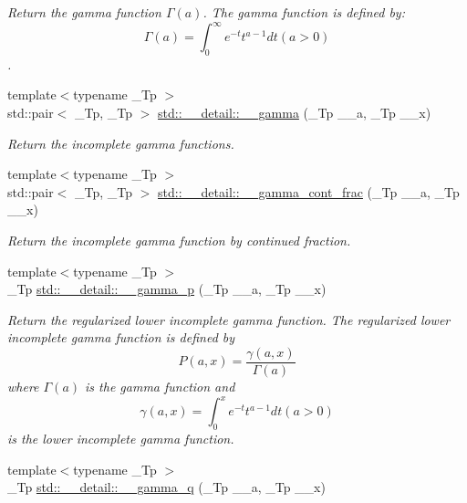 \begin{DoxyCompactItemize}
\begin{DoxyCompactList}\small\item\em Return the gamma function $ \Gamma(a) $. The gamma function is defined by\+: \[ \Gamma(a) = \int_0^\infty e^{-t}t^{a-1}dt (a > 0) \]. \end{DoxyCompactList}\item 
{\footnotesize template$<$typename \+\_\+\+Tp $>$ }\\std\+::pair$<$ \+\_\+\+Tp, \+\_\+\+Tp $>$ \hyperlink{namespacestd_1_1____detail_a00ade496acee116fb7990d20ff4be762}{std\+::\+\_\+\+\_\+detail\+::\+\_\+\+\_\+gamma} (\+\_\+\+Tp \+\_\+\+\_\+a, \+\_\+\+Tp \+\_\+\+\_\+x)
\begin{DoxyCompactList}\small\item\em Return the incomplete gamma functions. \end{DoxyCompactList}\item 
{\footnotesize template$<$typename \+\_\+\+Tp $>$ }\\std\+::pair$<$ \+\_\+\+Tp, \+\_\+\+Tp $>$ \hyperlink{namespacestd_1_1____detail_afd6319747af991947a02388acee40c26}{std\+::\+\_\+\+\_\+detail\+::\+\_\+\+\_\+gamma\+\_\+cont\+\_\+frac} (\+\_\+\+Tp \+\_\+\+\_\+a, \+\_\+\+Tp \+\_\+\+\_\+x)
\begin{DoxyCompactList}\small\item\em Return the incomplete gamma function by continued fraction. \end{DoxyCompactList}\item 
{\footnotesize template$<$typename \+\_\+\+Tp $>$ }\\\+\_\+\+Tp \hyperlink{namespacestd_1_1____detail_a4583981bd73c3d3bba970c2f91dc4ba5}{std\+::\+\_\+\+\_\+detail\+::\+\_\+\+\_\+gamma\+\_\+p} (\+\_\+\+Tp \+\_\+\+\_\+a, \+\_\+\+Tp \+\_\+\+\_\+x)
\begin{DoxyCompactList}\small\item\em Return the regularized lower incomplete gamma function. The regularized lower incomplete gamma function is defined by \[ P(a,x) = \frac{\gamma(a,x)}{\Gamma(a)} \] where $ \Gamma(a) $ is the gamma function and \[ \gamma(a,x) = \int_0^x e^{-t}t^{a-1}dt (a > 0) \] is the lower incomplete gamma function. \end{DoxyCompactList}\item 
{\footnotesize template$<$typename \+\_\+\+Tp $>$ }\\\+\_\+\+Tp \hyperlink{namespacestd_1_1____detail_a0ac19486073d0a7b2dc923b45b26777c}{std\+::\+\_\+\+\_\+detail\+::\+\_\+\+\_\+gamma\+\_\+q} (\+\_\+\+Tp \+\_\+\+\_\+a, \+\_\+\+Tp \+\_\+\+\_\+x)

\end{DoxyCompactItemize}
